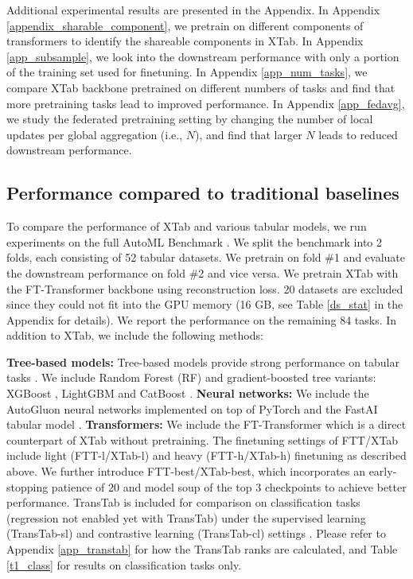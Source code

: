 Additional experimental results are presented in the Appendix. In Appendix \ref{appendix_sharable_component}, we pretrain on different components of transformers to identify the shareable components in XTab. In Appendix \ref{app_subsample}, we look into the downstream performance with only a portion of the training set used for finetuning. In Appendix \ref{app_num_tasks}, we compare XTab backbone pretrained on different numbers of tasks and find that more pretraining tasks lead to improved performance. In Appendix \ref{app_fedavg}, we study the federated pretraining setting by changing the number of local updates per global aggregation (i.e., $N$), and find that larger $N$ leads to reduced downstream performance.

\subsection{Performance compared to traditional baselines} 

To compare the performance of XTab and various tabular models, we run experiments on the full AutoML Benchmark \citep{gijsbers2022amlb}. We split the benchmark into 2 folds, each consisting of 52 tabular datasets. We pretrain on fold \#1 and evaluate the downstream performance on fold \#2 and vice versa. We pretrain XTab with the FT-Transformer backbone using reconstruction loss. 20 datasets are excluded since they could not fit into the GPU memory (16 GB, see Table \ref{ds_stat} in the Appendix for details). We report the performance on the remaining 84 tasks. In addition to XTab, we include the following methods:

\textbf{Tree-based models:} Tree-based models provide strong performance on tabular tasks \citep{grinsztajn2022tree}. We include Random Forest (RF) and gradient-boosted tree variants: XGBoost \citep{chen2016xgboost}, LightGBM \citep{ke2017lightgbm} and CatBoost \citep{dorogush2018catboost}. \textbf{Neural networks:} We include the AutoGluon neural networks implemented on top of PyTorch \citep{erickson2020autogluon} and the FastAI tabular model \citep{howard2020fastai}. \textbf{Transformers:} We include the FT-Transformer which is a direct counterpart of XTab without pretraining. The finetuning settings of FTT/XTab include light (FTT-l/XTab-l) and heavy (FTT-h/XTab-h) finetuning as described above. We further introduce FTT-best/XTab-best, which incorporates an early-stopping patience of 20 and model soup of the top 3 checkpoints \citep{wortsman2022model} to achieve better performance. TransTab is included for comparison on classification tasks (regression not enabled yet with TransTab) under the supervised learning (TransTab-sl) and contrastive learning (TransTab-cl) settings \citep{wang2022transtab}. Please refer to Appendix \ref{app_transtab} for how the TransTab ranks are calculated, and Table \ref{t1_class} for results on classification tasks only. 

